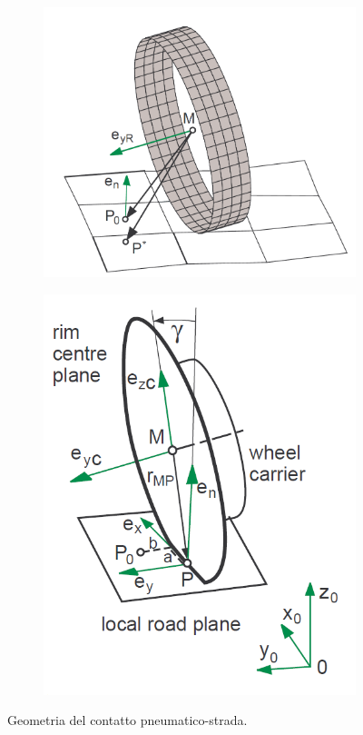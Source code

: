 \begin{figure}[h]
	\centering
	\begin{subfigure}{0.45\linewidth}
		\centering
		\includegraphics[width=\linewidth]{Figures/contact_geometry_1}
	\end{subfigure}
	\begin{subfigure}{0.35\linewidth}
		\centering
		\includegraphics[width=\linewidth]{Figures/contact_geometry_2}
	\end{subfigure}
	\caption{Geometria del contatto pneumatico-strada.}
	\label{contactgeometry}
\end{figure}
